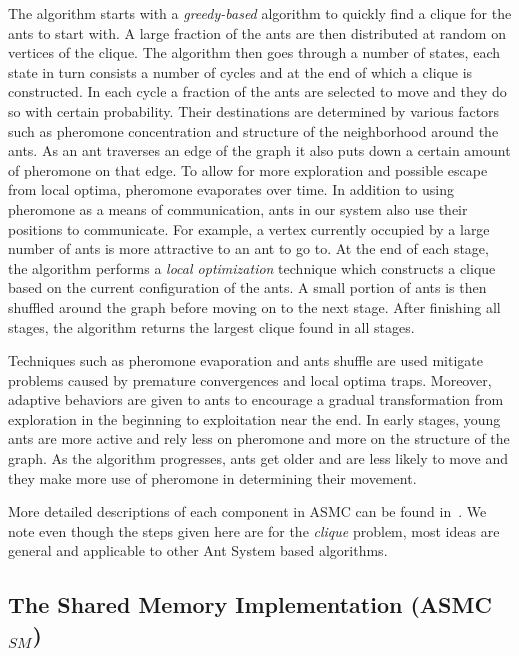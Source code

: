 \documentclass[11pt]{article}
\begin{document}
The algorithm starts with a \textit{greedy-based} algorithm to quickly find a clique for the ants to start with.  A large fraction of the ants are then distributed at random on vertices of the clique.  The algorithm then goes through a number of states, each state in turn consists a number of cycles and at the end of which a clique is constructed. In each cycle a fraction of the ants are selected to move and they do so with certain probability.  Their destinations are determined by various factors such as pheromone concentration and structure of the neighborhood around the ants.  As an ant traverses an edge of the graph it also puts down a certain amount of pheromone on that edge.  To allow for more exploration and possible escape from local optima, pheromone evaporates over time.  In addition to using pheromone as a means of communication, ants in our system also use their positions to communicate.  For example, a vertex currently occupied by a large number of ants is more attractive to an ant to go to. At the end of each stage, the algorithm performs a \textit{local optimization} technique which constructs a clique based on the current configuration of the ants. A small portion of ants is then shuffled around the graph before moving on to the next stage. After finishing all stages, the algorithm returns the largest clique found in all stages. %


Techniques such as pheromone evaporation and ants shuffle are used mitigate problems caused by premature convergences and local optima traps. Moreover, adaptive behaviors are given to ants to encourage a gradual transformation from exploration in the beginning to exploitation near the end. In early stages, young ants are more active and rely less on pheromone and more on the structure of the graph.  As the algorithm progresses, ants get older and are less likely to move and they make more use of pheromone in determining their movement.

More detailed descriptions of each component in ASMC can be found in~\cite{BR}. We note even though the steps given here are for the \textit{clique} problem, most ideas are general and applicable to other Ant System based algorithms. 

\subsection{The Shared Memory Implementation (ASMC$_{SM}$)}\label{ASMC_sm}
\end{document}
